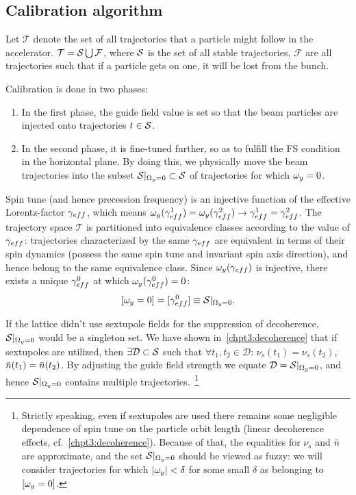 
\newcommand{\Traj}{\mathcal T}
\newcommand{\Fail}{\mathcal F}
\newcommand{\CO}{\mathrm{CO}}
\renewcommand{\D}{\mathcal D}

\subsection{Calibration algorithm}
Let $\Traj$ denote the set of all trajectories that a particle might follow in the accelerator.
$\Traj = \Stab \bigcup \Fail$, where $\Stab$ is the set of all stable trajectories, $\Fail$ are all trajectories
such that if a particle gets on one, it will be lost from the bunch.

Calibration is done in two phases:
\begin{enumerate}
\item In the first phase, the guide field value is set so that the beam particles are injected onto trajectories
  $t\in\Stab$.
\item In the second phase, it is fine-tuned further, so as to fulfill the FS condition in the horizontal plane.
  By doing this, we physically move the beam trajectories into the subset $\Stab*\subset\Stab$ of trajectories 
  for which $\omega_y = 0$.
\end{enumerate}

Spin tune (and hence precession frequency) is an injective function of the
effective Lorentz-factor $\g*$, which means
$\w_y(\g*^1) = \w_y(\g*^2) \rightarrow \g*^1 = \g*^2$. The trajectory space $\Traj$ is partitioned into equivalence
classes according to the value of $\g*$: trajectories characterized by the same $\g*$ are equivalent
in terms of their spin dynamics (possess the same spin tune and invariant spin axis direction),
and hence belong to the same equivalence class.
Since $\w_y(\g*)$ is injective, there exists a unique $\g*^0$ at which $\w_y(\g*^0)=0$:
\[
[\w_y=0] = [\g*^0] \equiv \Stab*.
\]

If the lattice didn't use sextupole fields for the suppression of decoherence,
$\Stab*$ would be a singleton set. We have shown in~\ref{chpt3:decoherence} that if sextupoles are
utilized, then $\exists\D\subset\Stab$ such that $\forall t_1,t_2\in\D$:
$\nu_s(t_1) = \nu_s(t_2)$, $\bar n(t_1) = \bar n(t_2)$. By adjusting the guide field strength we equate
$\D=\Stab*$, and hence $\Stab*$ contains multiple trajectories.~\footnote{Strictly speaking,
  even if sextupoles are used there remains some negligible dependence of spin tune
  on the particle orbit length (linear decoherence effects, cf.~\ref{chpt3:decoherence}).
  Because of that, the equalities for $\nu_s$ and $\bar n$ are approximate, and the set $\Stab*$
  should be viewed as fuzzy:
  we will consider trajectories for which $|\omega_y|<\delta$ for some small $\delta$ as belonging to $[\omega_y=0]$.}

